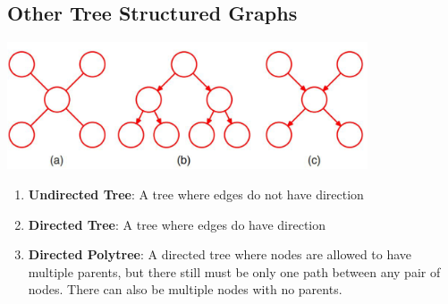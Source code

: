 \documentclass[10pt]{article}
\begin{document}
\subsection*{Other Tree Structured Graphs}
\begin{center} 
	\includegraphics*[width=0.8\textwidth]{M4_9.png} 
\end{center}
\begin{enumerate}[label=(\alph*)]
	\item \textbf{Undirected Tree}: A tree where edges do not have direction 
	\item \textbf{Directed Tree}: A tree where edges do have direction
	\item \textbf{Directed Polytree}: A directed tree where nodes are allowed to have multiple parents, but there still must be only one path between any pair of nodes.  There can also be multiple nodes with no parents.
\end{enumerate}
\end{document}
